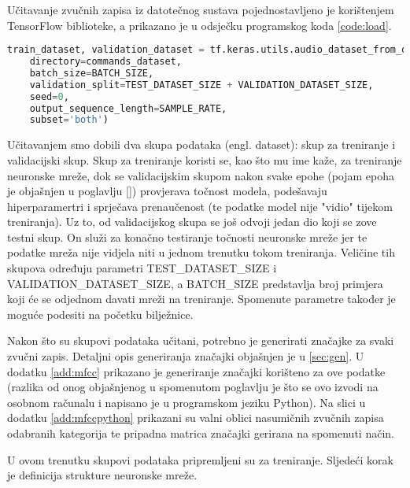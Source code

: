Učitavanje zvučnih zapisa iz datotečnog sustava pojednostavljeno je korištenjem
TensorFlow biblioteke, a prikazano je u odsječku programskog koda \ref{code:load}.

\begin{lstlisting}[language=Python, caption=Učitavanje zvučnih zapisa, label=code:load]
train_dataset, validation_dataset = tf.keras.utils.audio_dataset_from_directory(
    directory=commands_dataset,
    batch_size=BATCH_SIZE,
    validation_split=TEST_DATASET_SIZE + VALIDATION_DATASET_SIZE,
    seed=0,
    output_sequence_length=SAMPLE_RATE,
    subset='both')
\end{lstlisting}

Učitavanjem smo dobili dva skupa podataka (engl. dataset): skup za treniranje i validacijski skup.
Skup za treniranje koristi se, kao što mu ime kaže, za treniranje neuronske mreže,
dok se validacijskim skupom nakon svake epohe (pojam epoha je objašnjen u poglavlju \ref{}) 
provjerava točnost modela, podešavaju
hiperparamertri i sprječava prenaučenost (te podatke model nije "vidio" tijekom treniranja).
Uz to, od validacijskog skupa se još odvoji jedan dio koji se zove testni skup. On služi
za konačno testiranje točnosti neuronske mreže jer te podatke mreža nije vidjela niti
u jednom trenutku tokom treniranja. Veličine tih skupova određuju parametri 
TEST\_DATASET\_SIZE i VALIDATION\_DATASET\_SIZE, a BATCH\_SIZE predstavlja
broj primjera koji će se odjednom davati mreži na treniranje. Spomenute parametre
također je moguće podesiti na početku bilježnice. 

Nakon što su skupovi podataka učitani, potrebno je generirati značajke za svaki zvučni zapis.
Detaljni opis generiranja značajki objašnjen je u \ref{sec:gen}. U dodatku \ref{add:mfcc} prikazano
je generiranje značajki korišteno za ove podatke (razlika od onog objašnjenog u spomenutom poglavlju
je što se ovo izvodi na osobnom računalu i napisano je u programskom jeziku Python).
Na slici u dodatku \ref{add:mfccpython} prikazani su valni oblici nasumičnih zvučnih zapisa odabranih 
kategorija te pripadna matrica značajki gerirana na spomenuti način.

U ovom trenutku skupovi podataka pripremljeni su za treniranje. Sljedeći korak je definicija 
strukture neuronske mreže.